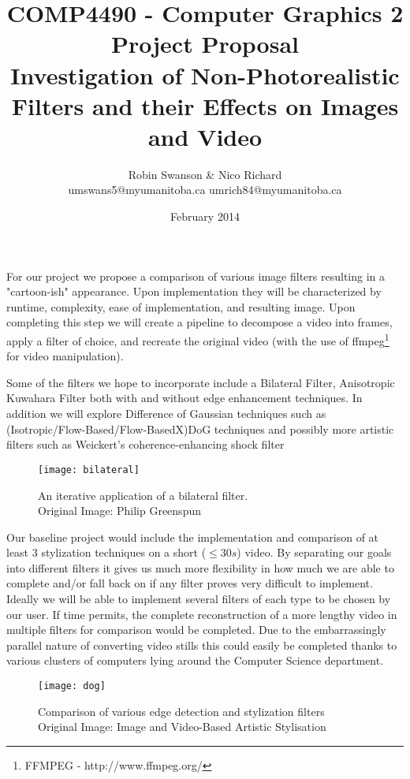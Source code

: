 \documentclass[10pt]{article}
\title{COMP4490 - Computer Graphics 2 \\ Project Proposal \\ Investigation of Non-Photorealistic Filters and their Effects on Images and Video}
\author{Robin Swanson \& Nico Richard\\ umswans5@myumanitoba.ca umrich84@myumanitoba.ca}
\date{February 2014}
\begin{document}
\maketitle

For our project we propose a comparison of various image filters resulting in a "cartoon-ish" appearance. Upon implementation they will be characterized by runtime, complexity, ease of implementation, and resulting image. Upon completing this step we will create a pipeline to decompose a video into frames, apply a filter of choice, and recreate the original video (with the use of ffmpeg\footnote{FFMPEG - http://www.ffmpeg.org/} for video manipulation).

Some of the filters we hope to incorporate include a Bilateral Filter\cite{bilateral}, Anisotropic Kuwahara Filter\cite{AKF} both with and without edge enhancement techniques. In addition we will explore Difference of Gaussian techniques such as (Isotropic/Flow-Based/Flow-BasedX)DoG techniques\cite{dog, fbdog, moredog} and possibly more artistic filters such as Weickert's coherence-enhancing shock filter\cite{weickert}

\begin{center}
\begin{figure}[!htb]
		\centering
		\texttt{[image: bilateral]}
		\caption{An iterative application of a bilateral filter. \\ Original Image: Philip Greenspun}
\end{figure}
\end{center}

Our baseline project would include the implementation and comparison of at least 3 stylization techniques on a short ($\leq 30s$) video. By separating our goals into different filters it gives us much more flexibility in how much we are able to complete and/or fall back on if any filter proves very difficult to implement. Ideally we will be able to implement several filters of each type to be chosen by our user. If time permits, the complete reconstruction of a more lengthy video in multiple filters for comparison would be completed. Due to the embarrassingly parallel nature of converting video stills this could easily be completed thanks to various clusters of computers lying around the Computer Science department.

\begin{center}
\begin{figure}[!htb]
		\centering
		\texttt{[image: dog]}
		\caption{Comparison of various edge detection and stylization filters \\ Original Image: Image and Video-Based Artistic Stylisation\cite{book}}
\end{figure}
\end{center}
\end{document}
